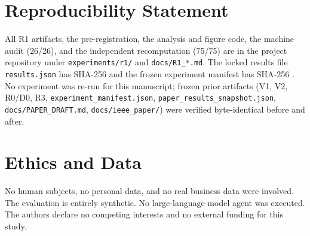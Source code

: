 \documentclass[10pt,twocolumn,a4paper]{article}
\newcommand{\code}[1]{\texttt{#1}}
\begin{document}
\FloatBarrier  %
\appendix

\section{Reproducibility Statement}
All R1 artifacts, the pre-registration, the analysis and figure code, the
machine audit (26/26), and the independent recomputation (75/75) are in the
project repository under \code{experiments/r1/} and \code{docs/R1\_*.md}. The
locked results file \code{results.json} has SHA-256
{\footnotesize\ttfamily{}}
and the frozen experiment manifest has SHA-256
{\footnotesize\ttfamily{}}.
No experiment was re-run for this manuscript; frozen prior artifacts
(V1, V2, R0/D0, R3, \code{experiment\_manifest.json},
\code{paper\_results\_snapshot.json}, \code{docs/PAPER\_DRAFT.md},
\code{docs/ieee\_paper/}) were verified byte-identical before and after.

\section{Ethics and Data}
No human subjects, no personal data, and no real business data were involved.
The evaluation is entirely synthetic. No large-language-model agent was
executed. The authors declare no competing interests and no external funding for
this study.

\FloatBarrier  %


\end{document}
